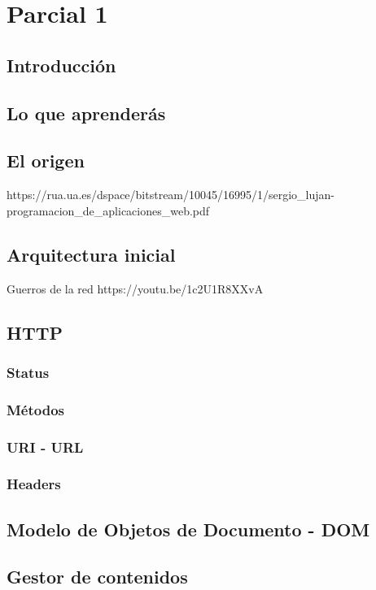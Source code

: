 \chapter{Parcial 1}

\section{Introducción}

\section{Lo que aprenderás}

\section{El origen}
https://rua.ua.es/dspace/bitstream/10045/16995/1/sergio_lujan-programacion_de_aplicaciones_web.pdf

\section{Arquitectura inicial}

Guerros de la red
https://youtu.be/1c2U1R8XXvA

\section{HTTP}
\subsection{Status}
\subsection{Métodos}
\subsection{URI - URL}
\subsection{Headers}

\section{Modelo de Objetos de Documento - DOM}

\section{Gestor de contenidos}

